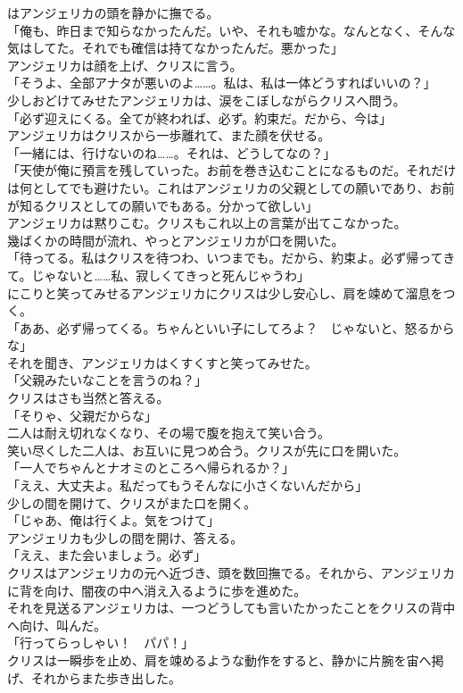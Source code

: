 \documentclass[b5j,10pt,openany]{jsbook}
\begin{document}
はアンジェリカの頭を静かに撫でる。\\「俺も、昨日まで知らなかったんだ。いや、それも嘘かな。なんとなく、そんな気はしてた。それでも確信は持てなかったんだ。悪かった」\\アンジェリカは顔を上げ、クリスに言う。\\「そうよ、全部アナタが悪いのよ\ldots{}\ldots{}。私は、私は一体どうすればいいの？」\\少しおどけてみせたアンジェリカは、涙をこぼしながらクリスへ問う。\\「必ず迎えにくる。全てが終われば、必ず。約束だ。だから、今は」\\アンジェリカはクリスから一歩離れて、また顔を伏せる。\\「一緒には、行けないのね\ldots{}\ldots{}。それは、どうしてなの？」\\「天使が俺に預言を残していった。お前を巻き込むことになるものだ。それだけは何としてでも避けたい。これはアンジェリカの父親としての願いであり、お前が知るクリスとしての願いでもある。分かって欲しい」\\アンジェリカは黙りこむ。クリスもこれ以上の言葉が出てこなかった。\\幾ばくかの時間が流れ、やっとアンジェリカが口を開いた。\\「待ってる。私はクリスを待つわ、いつまでも。だから、約束よ。必ず帰ってきて。じゃないと\ldots{}\ldots{}私、寂しくてきっと死んじゃうわ」\\にこりと笑ってみせるアンジェリカにクリスは少し安心し、肩を竦めて溜息をつく。\\「ああ、必ず帰ってくる。ちゃんといい子にしてろよ？　じゃないと、怒るからな」\\それを聞き、アンジェリカはくすくすと笑ってみせた。\\「父親みたいなことを言うのね？」\\クリスはさも当然と答える。\\「そりゃ、父親だからな」\\二人は耐え切れなくなり、その場で腹を抱えて笑い合う。\\笑い尽くした二人は、お互いに見つめ合う。クリスが先に口を開いた。\\「一人でちゃんとナオミのところへ帰られるか？」\\「ええ、大丈夫よ。私だってもうそんなに小さくないんだから」\\少しの間を開けて、クリスがまた口を開く。\\「じゃあ、俺は行くよ。気をつけて」\\アンジェリカも少しの間を開け、答える。\\「ええ、また会いましょう。必ず」\\クリスはアンジェリカの元へ近づき、頭を数回撫でる。それから、アンジェリカに背を向け、闇夜の中へ消え入るように歩を進めた。\\それを見送るアンジェリカは、一つどうしても言いたかったことをクリスの背中へ向け、叫んだ。\\「行ってらっしゃい！　パパ！」\\クリスは一瞬歩を止め、肩を竦めるような動作をすると、静かに片腕を宙へ掲げ、それからまた歩き出した。
\end{document}

